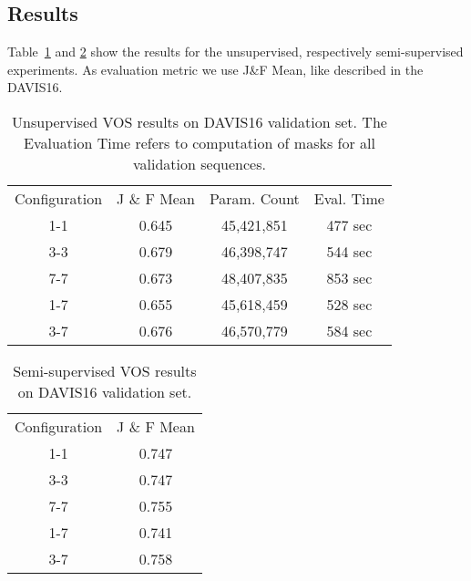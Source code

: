 \subsection{Results}
Table~\ref{unsupervised_results} and \ref{semi_supervised_results} show the results for the unsupervised, respectively semi-supervised experiments. As evaluation metric we use J\&F Mean, like described in the DAVIS16\cite{davis_2016}.
\begin{table}[]
	\centering
	\begin{tabular}{|c|c|c|c|}
		\cline{1-4}
		Configuration & J \& F Mean & Param. Count & Eval. Time \\ \cline{1-4}
		1-1  & 0.645  & 45,421,851 & 477 sec\\ \cline{1-4}
		3-3    & 0.679 & 46,398,747 & 544 sec\\ \cline{1-4}
		7-7    & 0.673 & 48,407,835 & 853 sec\\ \cline{1-4}
		1-7    & 0.655  & 45,618,459 & 528 sec\\ \cline{1-4}
		3-7    & 0.676  & 46,570,779 & 584 sec\\ \cline{1-4}
	\end{tabular}
	\caption{Unsupervised VOS results on DAVIS16 validation set. The Evaluation Time refers to computation of masks for all validation sequences.}
	\label{unsupervised_results}
\end{table}

\begin{table}[]
	\centering
	\begin{tabular}{|c|c|}
		\cline{1-2}
		Configuration & J \& F Mean\\ \cline{1-2}
		1-1  & 0.747  \\ \cline{1-2}
		3-3    & 0.747 \\ \cline{1-2}
		7-7    & 0.755 \\ \cline{1-2}
		1-7    & 0.741  \\ \cline{1-2}
		3-7    & 0.758  \\ \cline{1-2}
	\end{tabular}
	\caption{Semi-supervised VOS results on DAVIS16 validation set.}
	\label{semi_supervised_results}
\end{table}
